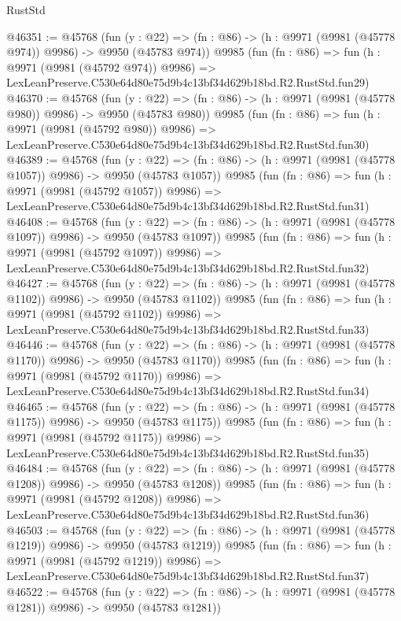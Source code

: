 \begin{lexlean}{RustStd}
\begin{coremodule}
@46351 := @45768
    (fun (y : @22) => (fn : @86) -> (h : @9971 (@9981 (@45778 @974)) @9986) -> @9950 (@45783 @974))
    @9985
    (fun (fn : @86) =>
    fun (h : @9971 (@9981 (@45792 @974)) @9986) =>
    LexLeanPreserve.C530e64d80e75d9b4c13bf34d629b18bd.R2.RustStd.fun29)
@46370 := @45768
    (fun (y : @22) => (fn : @86) -> (h : @9971 (@9981 (@45778 @980)) @9986) -> @9950 (@45783 @980))
    @9985
    (fun (fn : @86) =>
    fun (h : @9971 (@9981 (@45792 @980)) @9986) =>
    LexLeanPreserve.C530e64d80e75d9b4c13bf34d629b18bd.R2.RustStd.fun30)
@46389 := @45768
    (fun (y : @22) =>
    (fn : @86) -> (h : @9971 (@9981 (@45778 @1057)) @9986) -> @9950 (@45783 @1057))
    @9985
    (fun (fn : @86) =>
    fun (h : @9971 (@9981 (@45792 @1057)) @9986) =>
    LexLeanPreserve.C530e64d80e75d9b4c13bf34d629b18bd.R2.RustStd.fun31)
@46408 := @45768
    (fun (y : @22) =>
    (fn : @86) -> (h : @9971 (@9981 (@45778 @1097)) @9986) -> @9950 (@45783 @1097))
    @9985
    (fun (fn : @86) =>
    fun (h : @9971 (@9981 (@45792 @1097)) @9986) =>
    LexLeanPreserve.C530e64d80e75d9b4c13bf34d629b18bd.R2.RustStd.fun32)
@46427 := @45768
    (fun (y : @22) =>
    (fn : @86) -> (h : @9971 (@9981 (@45778 @1102)) @9986) -> @9950 (@45783 @1102))
    @9985
    (fun (fn : @86) =>
    fun (h : @9971 (@9981 (@45792 @1102)) @9986) =>
    LexLeanPreserve.C530e64d80e75d9b4c13bf34d629b18bd.R2.RustStd.fun33)
@46446 := @45768
    (fun (y : @22) =>
    (fn : @86) -> (h : @9971 (@9981 (@45778 @1170)) @9986) -> @9950 (@45783 @1170))
    @9985
    (fun (fn : @86) =>
    fun (h : @9971 (@9981 (@45792 @1170)) @9986) =>
    LexLeanPreserve.C530e64d80e75d9b4c13bf34d629b18bd.R2.RustStd.fun34)
@46465 := @45768
    (fun (y : @22) =>
    (fn : @86) -> (h : @9971 (@9981 (@45778 @1175)) @9986) -> @9950 (@45783 @1175))
    @9985
    (fun (fn : @86) =>
    fun (h : @9971 (@9981 (@45792 @1175)) @9986) =>
    LexLeanPreserve.C530e64d80e75d9b4c13bf34d629b18bd.R2.RustStd.fun35)
@46484 := @45768
    (fun (y : @22) =>
    (fn : @86) -> (h : @9971 (@9981 (@45778 @1208)) @9986) -> @9950 (@45783 @1208))
    @9985
    (fun (fn : @86) =>
    fun (h : @9971 (@9981 (@45792 @1208)) @9986) =>
    LexLeanPreserve.C530e64d80e75d9b4c13bf34d629b18bd.R2.RustStd.fun36)
@46503 := @45768
    (fun (y : @22) =>
    (fn : @86) -> (h : @9971 (@9981 (@45778 @1219)) @9986) -> @9950 (@45783 @1219))
    @9985
    (fun (fn : @86) =>
    fun (h : @9971 (@9981 (@45792 @1219)) @9986) =>
    LexLeanPreserve.C530e64d80e75d9b4c13bf34d629b18bd.R2.RustStd.fun37)
@46522 := @45768
    (fun (y : @22) =>
    (fn : @86) -> (h : @9971 (@9981 (@45778 @1281)) @9986) -> @9950 (@45783 @1281))

\end{coremodule}
\end{lexlean}
